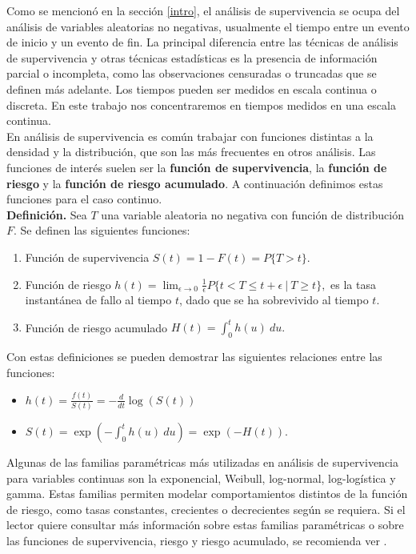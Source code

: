 \documentclass[11pt,a4paper]{article}
\begin{document}
Como se mencionó en la sección \ref{intro}, el análisis de supervivencia se ocupa del análisis de variables aleatorias no negativas, usualmente el tiempo entre un evento de inicio y un evento de fin.  La principal diferencia entre las técnicas de análisis de supervivencia y otras técnicas estadísticas es la presencia de información parcial o incompleta, como las observaciones censuradas o truncadas que se definen más adelante. Los tiempos pueden ser medidos en escala continua o discreta. En este trabajo nos concentraremos en tiempos medidos en una escala continua.\\

En análisis de supervivencia es común trabajar con funciones distintas a la densidad y la distribución, que son las más frecuentes en otros análisis. Las funciones de interés suelen ser la \textbf{función de supervivencia}, la \textbf{función de riesgo} y la \textbf{función de riesgo acumulado}. A continuación definimos estas funciones para el caso continuo.\\

\textbf{Definición.} Sea $T$ una variable aleatoria no negativa con función de distribución $F$. Se definen las siguientes funciones:
\begin{enumerate}
\item Función de supervivencia $S(t) = 1-F(t) = P\lbrace T > t \rbrace$.
\item Función de riesgo $h(t) = \lim_{\epsilon \to 0} \frac{1}{\epsilon}P\lbrace t<T\leq t+\epsilon \ | \ T \geq t \rbrace,$  es la tasa instantánea de fallo al tiempo $t$, dado que se ha sobrevivido al tiempo $t$.
\item Función de riesgo acumulado $H(t) = \int_0^t h(u) \ du.$
\end{enumerate}
Con estas definiciones se pueden demostrar las siguientes relaciones entre las funciones:
\begin{itemize}
\item $h(t) = \frac{f(t)}{S(t)} = -\frac{d}{dt}\log(S(t))$
\item $S(t) = \exp \left(-\int_0^t h(u) \ du\right) = \exp(-H(t)).$\\
\end{itemize}

Algunas de las familias paramétricas más utilizadas en análisis de supervivencia para variables continuas son la exponencial, Weibull, log-normal, log-logística y gamma. Estas familias permiten modelar comportamientos distintos de la función de riesgo, como tasas constantes, crecientes o decrecientes según se requiera. Si el lector quiere consultar más información sobre estas familias paramétricas o sobre las funciones de supervivencia, riesgo y riesgo acumulado, se recomienda ver \citet{klein}.\\
\end{document}
